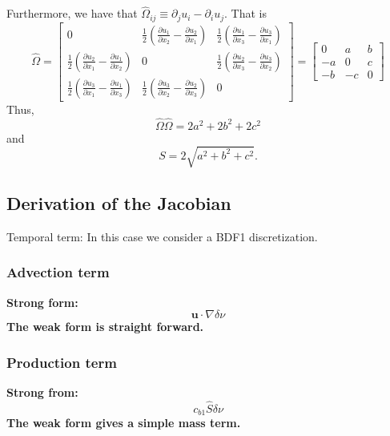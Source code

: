 \documentclass[twoside, 11pt, a4paper]{article}
\begin{document}
Furthermore, we have that $\hat{\Omega}_{ij} \equiv \partial_j u_i-\partial_i u_j$.
That is
\[
  \hat{\Omega}  = \begin{bmatrix}
                    0 & \frac{1}{2}\left(\frac{\partial u_1}{\partial x_2}-\frac{\partial u_2}{\partial x_1}\right) & \frac{1}{2}\left(\frac{\partial u_1}{\partial x_3}-\frac{\partial u_3}{\partial x_1}\right) \\
                    \frac{1}{2}\left(\frac{\partial u_2}{\partial x_1}-\frac{\partial u_1}{\partial x_2}\right) & 0 & \frac{1}{2}\left(\frac{\partial u_2}{\partial x_3}-\frac{\partial u_3}{\partial x_2}\right) \\
                    \frac{1}{2}\left(\frac{\partial u_3}{\partial x_1}-\frac{\partial u_1}{\partial x_3}\right) & \frac{1}{2}\left(\frac{\partial u_3}{\partial x_2}-\frac{\partial u_2}{\partial x_3}\right) & 0
                  \end{bmatrix} =
                  \begin{bmatrix}
                     0 & a & b \\
                    -a & 0 & c \\
                    -b & -c & 0
                  \end{bmatrix}
\]
Thus,
\[
  \hat{\Omega}\hat{\Omega}  = 2a^2+2b^2+2c^2
\]
and
\[
  S = 2\sqrt{a^2+b^2+c^2}.
\]

\subsection*{Derivation of the Jacobian}
Temporal term: In this case we consider a BDF1 discretization.

\subsubsection*{Advection term}
\bf Strong form:\rm
\begin{equation}
  \mathbf{u}\cdot\nabla\delta\nu
\end{equation}
The weak form is straight forward.

\subsubsection*{Production term}
\bf Strong from:\rm
\begin{equation}
  c_{b1}\hat{S}\delta\nu
\end{equation}
The weak form gives a simple mass term.
\end{document}
